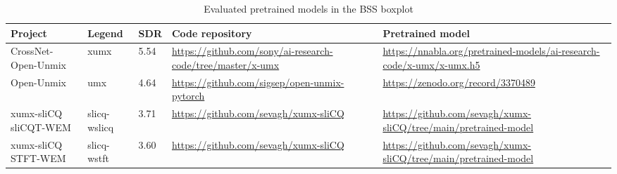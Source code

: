 \documentclass[report.tex]{subfiles}
\begin{document}
\begin{table}[ht]
	\centering
	\caption{Evaluated pretrained models in the BSS boxplot}
	\label{table:bsseval}
	\begin{tabular}{ |p{2.5cm}|l|l|p{3.5cm}|p{3.5cm}| }
	 \hline
		Project & Legend & SDR & Code repository & Pretrained model \\
	 \hline
	 \hline
		CrossNet-Open-Unmix & xumx & 5.54 & \url{https://github.com/sony/ai-research-code/tree/master/x-umx} & \url{https://nnabla.org/pretrained-models/ai-research-code/x-umx/x-umx.h5} \\
	 \hline
		Open-Unmix & umx & 4.64 & \url{https://github.com/sigsep/open-unmix-pytorch} & \url{https://zenodo.org/record/3370489} \\
	 \hline
		\makecell[l]{xumx-sliCQ \\ sliCQT-WEM} & slicq-wslicq & 3.71 & \url{https://github.com/sevagh/xumx-sliCQ} & \url{https://github.com/sevagh/xumx-sliCQ/tree/main/pretrained-model} \\
	 \hline
		\makecell[l]{xumx-sliCQ \\ STFT-WEM} & slicq-wstft & 3.60 & \url{https://github.com/sevagh/xumx-sliCQ} & \url{https://github.com/sevagh/xumx-sliCQ/tree/main/pretrained-model} \\
	 \hline
\end{tabular}
\end{table}
\end{document}
